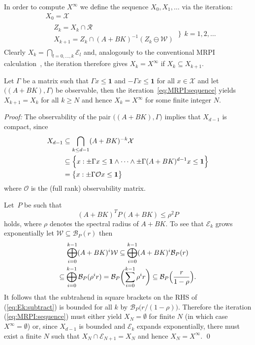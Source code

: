 \documentclass{ifacconf}
\def\bpf{\textnormal{\textit{Proof:}\hspace{1ex}}}
\def\epf{\hfill \mbox{\qed}}%
\newcommand{\Obs}{\mathcal{O}}
\providecommand{\B}{\mathcal B}
\providecommand{\E}{\mathcal E}
\providecommand{\W}{\mathcal W}
\providecommand{\X}{\mathcal X}
\providecommand{\R}{\mathcal R}
\providecommand{\bfa}[1]{\mathbf{#1}}
\begin{document}
%
In order to compute $X^\infty$ we define the sequence $X_0,X_1,\ldots$ via the iteration:
%
\begin{equation}\label{eq:MRPI:sequence}
\begin{aligned}
  & X_0 = \X \\
  & \begin{aligned}
      & Z_k = X_k\cap\R\\
      & X_{k+1} = Z_k\cap(A+BK)^{-1}(Z_k\ominus\W)
    \end{aligned} 
  \ \Biggr\} \ \ k = 1,2,\ldots
\end{aligned}
\end{equation}
%
Clearly $X_k = \bigcap_{l=0,\ldots,k}\E_l$ and, analogously to the conventional MRPI calculation~\citep{Kolmanovsky:1998}, the iteration therefore gives $X_k = X^\infty$ if $X_k\subseteq X_{k+1}$.

\vspace{0.5\baselineskip}
\begin{thm}\label{thm2}
Let $\Gamma$ be a matrix such that $\Gamma x\leq\bfa{1}$ and $-\Gamma x\leq\bfa{1}$ for all $x\in\X$ and let $\bigl((A+BK),\Gamma\bigr)$ be observable, then the iteration~\eqref{eq:MRPI:sequence} %
yields $X_{k+1}=X_k$ for all $k\geq N$ and hence $X_k=X^\infty$ for some finite integer $N$.
\end{thm}
%
\bpf
%
The observability of the pair $\bigl((A+BK),\Gamma\bigr)$ implies that $X_{d-1}$ is compact, since 
\begin{align*}
X_{d-1} 
&\subseteq\bigcap_{k\leq d-1}(A+BK)^{-k}\X\\
&\subseteq \Bigl\{x:\pm\Gamma x\leq\bfa{1}\wedge\dots\wedge\pm\Gamma(A+BK)^{d-1} x\leq\bfa{1} \Bigr\}\\
& = \bigl\{x:\pm\Gamma \Obs x\leq \bfa{1}\bigr\}
\end{align*}
where $\Obs$ is the (full rank) observability matrix.

Let~$P$ be such that 
\[
(A+BK)^TP(A+BK) \leq \rho^2P
\]
holds, where $\rho$ denotes the spectral radius of $A+BK$.
%
To see that $\E_k$ grows exponentially let $\W\subseteq\B_P(r)$ then
%
\begin{multline*}
  \bigoplus_{i=0}^{k-1}(A+BK)^i\W \subseteq \bigoplus_{i=0}^{k-1}(A+BK)^i\B_P(r)\\
  \subseteq\bigoplus_{i=0}^{k-1}\B_P(\rho^i r) = \B_P\biggl(\sum_{i=0}^{k-1}\rho^i r\biggr)\subseteq\B_P\Bigl(\frac{r}{1-\rho}\Bigr) .
\end{multline*}
%
It follows that the subtrahend in square brackets on the RHS of (\ref{eq:Ek:subtract}) is bounded for all $k$ by $\B_P\bigl(r / (1-\rho)\bigr)$.
%
Therefore 
the iteration (\ref{eq:MRPI:sequence}) must either yield $X_N = \emptyset$ for finite $N$
(in which case $X^\infty=\emptyset$) or,
since $X_{d-1}$ is bounded and $\E_k$ expands exponentially, there must exist a finite $N$ such that $X_{N}\cap\E_{N+1}=X_N$ and hence $X_N=X^\infty$.
%
\epf
\end{document}
